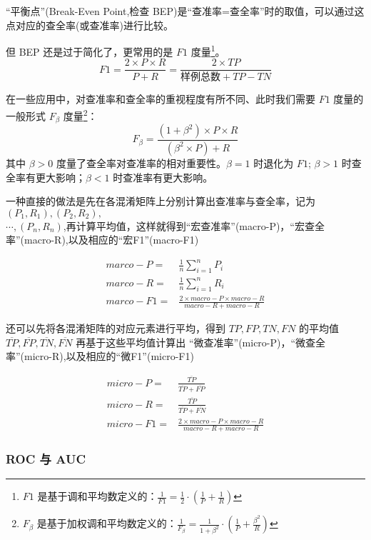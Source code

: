 ``平衡点''(Break-Even Point,检查 BEP)是``查准率=查全率''时的取值，可以通过这点对应的查全率(或查准率)进行比较。

但 BEP 还是过于简化了，更常用的是 $F1$ 度量\footnote{$F1$ 是基于调和平均数定义的：$\frac{1}{F1} = \frac{1}{2} \cdot (\frac{1}{P} + \frac{1}{R})$}。
\begin{equation}
    F1 = \frac{2\times P \times R}{P+R} = \frac{2 \times TP}{\text{样例总数} + TP - TN}
\end{equation}

在一些应用中，对查准率和查全率的重视程度有所不同、此时我们需要 $F1$ 度量的一般形式 $F_\beta$ 度量\footnote{ $F_\beta$ 是基于加权调和平均数定义的：$\frac{1}{F_{\beta}} = \frac{1}{1+\beta ^ 2} \cdot (\frac{1}{P} + \frac{\beta ^2}{R})$}：
\begin{equation}
    F_{\beta} = \frac{(1+\beta^2)\times P \times R}{(\beta ^ 2 \times P) + R}
\end{equation}
其中 $\beta>0$ 度量了查全率对查准率的相对重要性。$\beta = 1$ 时退化为 $F1$; $\beta > 1$ 时查全率有更大影响；$\beta <1$ 时查准率有更大影响。

一种直接的做法是先在各混淆矩阵上分别计算出查准率与查全率，记为 $(P_1,R_1),(P_2,R_2),$\\
$\cdots,(P_n,R_n)$,再计算平均值，这样就得到``宏查准率''(macro-P)，``宏查全率''(macro-R),以及相应的``宏F1''(macro-F1)

\begin{align}
    marco-P =& \frac{1}{n}\sum_{i=1}^n P_{i} \\
    marco-R =& \frac{1}{n}\sum_{i=1}^n R_{i} \\
    marco-F1 =& \frac{ 2\times macro-P \times macro-R }{ macro-R + macro-R } 
\end{align}

还可以先将各混淆矩阵的对应元素进行平均，得到 $TP,FP,TN,FN$ 的平均值 $\overline{TP},\overline{FP},\overline{TN},\overline{FN}$ 再基于这些平均值计算出 ``微查准率''(micro-P)，``微查全率''(micro-R),以及相应的``微F1''(micro-F1)

\begin{align}
    micro-P =& \frac{\overline{TP}}{\overline{TP} + \overline{FP}} \\
    micro-R =& \frac{\overline{TP}}{\overline{TP} + \overline{FN}} \\
    micro-F1 =& \frac{ 2\times macro-P \times macro-R }{ macro-R + macro-R } 
\end{align}

\subsubsection{ROC 与 AUC}

